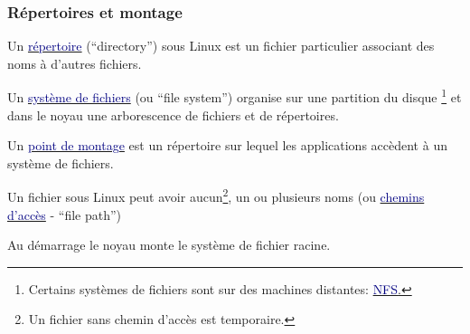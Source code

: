 \documentclass[lualatex,11pt,a4paper,svgnames,french]{beamer}
\begin{document}
\begin{frame}\frametitle{Répertoires et montage}

  Un
  {\href{https://fr.wikipedia.org/wiki/Répertoire_(informatique)}{\textcolor{Navy}{répertoire}}}
    (``directory'') sous Linux est un fichier particulier associant
    des noms à d'autres fichiers.

    \medskip
    
  Un
  {\href{https://fr.wikipedia.org/wiki/Système_de_fichiers}{\textcolor{Navy}{système
        de fichiers}}} (ou ``file system'') organise sur une partition
  du disque
  \footnote{Certains systèmes de fichiers sont sur des machines distantes:
  {\href{https://fr.wikipedia.org/wiki/Network_File_System}{\textcolor{Navy}{NFS}.\smallskip}}}
   et dans le noyau une arborescence de fichiers et de répertoires.

   \medskip

 Un
 {\href{https://fr.wikipedia.org/wiki/Point_de_montage}{\textcolor{Navy}{point
       de montage}}} est un répertoire sur lequel les applications accèdent à un
 système de fichiers.

 \medskip
 
Un fichier sous Linux peut avoir aucun\footnote{Un fichier sans
chemin d'accès est temporaire.}, un ou plusieurs noms (ou
{\href{https://fr.wikipedia.org/wiki/Chemin_d'accès}{\textcolor{Navy}{chemins
      d'accès}}} - ``file path'')
\medskip

Au démarrage le noyau monte le système de fichier racine.

\end{frame}
\end{document}
